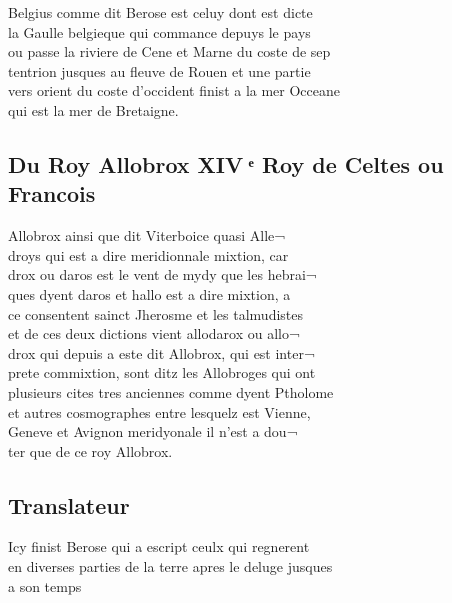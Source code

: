 \documentclass[12pt]{article}
\begin{document}
Belgius comme dit Berose est celuy dont est dicte\\
la Gaulle belgieque qui commance
          depuys le pays\\
ou passe la riviere de Cene et Marne du coste de sep\\
tentrion jusques au fleuve de Rouen et une partie\\
vers orient du coste
          d'occident finist a la mer Occeane\\
qui est la mer de Bretaigne.





\newpage
\subsection*{Du Roy Allobrox
          XIV ͤ Roy de Celtes ou Francois}


Allobrox ainsi que dit Viterboice quasi Alle¬\\
droys qui est a dire meridionnale mixtion, car\\
drox ou daros est le vent de mydy que les hebrai¬\\
ques dyent daros et
              hallo est a dire mixtion, a\\
ce consentent sainct Jherosme et
          les talmudistes\\
et de ces deux dictions vient allodarox ou allo¬\\
drox
          qui depuis a este dit Allobrox, qui est inter¬\\
prete commixtion, sont ditz les Allobroges qui ont\\
plusieurs cites tres
          anciennes comme dyent Ptholome\\
et autres
          cosmographes entre lesquelz est Vienne,\\
Geneve et Avignon meridyonale il n'est
          a dou¬\\
ter que de ce roy Allobrox.





\subsection*{Translateur}


Icy finist Berose qui a escript ceulx qui
            regnerent\\
en diverses parties de la terre apres le deluge jusques\\
a
          son temps
\end{document}
